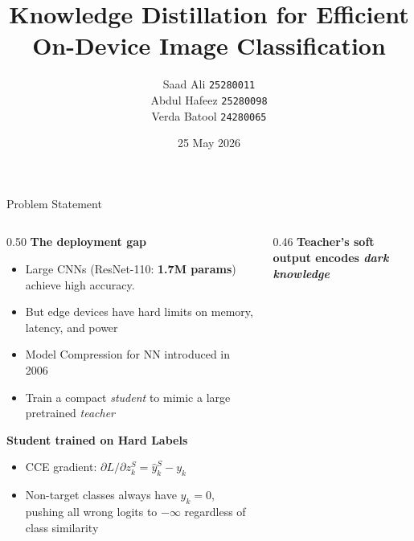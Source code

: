 \documentclass[english, hyperref={colorlinks,citecolor=blue,linkcolor=blue,urlcolor=blue}, handout]{beamer}
\title[KD for On-Device Classification]{%
  Knowledge Distillation for Efficient\\On-Device Image Classification%
}
\author[Saad $\cdot$ Hafeez $\cdot$ Verda]{%
  Saad Ali \texttt{25280011}\\[0.2em]
  Abdul Hafeez \texttt{25280098}\\[0.2em]
  Verda Batool \texttt{24280065}%
}
\institute[LUMS]{Lahore University of Management Sciences}
\date{25 May 2026}
\begin{document}

\begin{frame}
  \titlepage
\end{frame}

\begin{frame}{Problem Statement}
  \begin{columns}[t]
    \begin{column}{0.50\textwidth}
      \textbf{The deployment gap}
      \begin{itemize}\footnotesize
        \item Large CNNs (ResNet-110: \textbf{1.7M params}) achieve high accuracy.
        \item But edge devices have hard limits on memory, latency, and power
        \item Model Compression for NN introduced in 2006
        \item Train a compact \emph{student} to mimic a large pretrained \emph{teacher}
      \end{itemize}
      \vspace{0.35em}
      \textbf{Student trained on Hard Labels}
      \begin{itemize}\small
        \item CCE gradient: $\partial L/\partial z_k^S = \hat{y}_k^S - y_k$
        \item Non-target classes always have $y_k{=}0$, pushing all wrong logits to $-\infty$ regardless of class similarity
      \end{itemize}
    \end{column}
    \begin{column}{0.46\textwidth}
      \textbf{Teacher's soft output encodes \emph{dark knowledge}}
      \vspace{0.3em}


\end{column}
\end{columns}
\end{frame}
\end{document}
